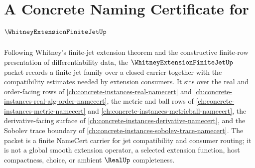 \chapter{A Concrete Naming Certificate for $\WhitneyExtensionFiniteJetUp$}
\label{ch:concrete-instances-whitney-extension-finite-jet-namecert}

Following Whitney's finite-jet extension theorem and the constructive finite-row presentation of differentiability data, the $\WhitneyExtensionFiniteJetUp$ packet records a finite jet family over a closed carrier together with the compatibility estimates needed by extension consumers. It sits over the real and order-facing rows of \autoref{ch:concrete-instances-real-namecert} and \autoref{ch:concrete-instances-real-alg-order-namecert}, the metric and ball rows of \autoref{ch:concrete-instances-metric-namecert} and \autoref{ch:concrete-instances-metricball-namecert}, the derivative-facing surface of \autoref{ch:concrete-instances-derivative-namecert}, and the Sobolev trace boundary of \autoref{ch:concrete-instances-sobolev-trace-namecert}. The packet is a finite NameCert carrier for jet compatibility and consumer routing; it is not a global smooth extension operator, a selected extension function, host compactness, choice, or ambient $\RealUp$ completeness.

